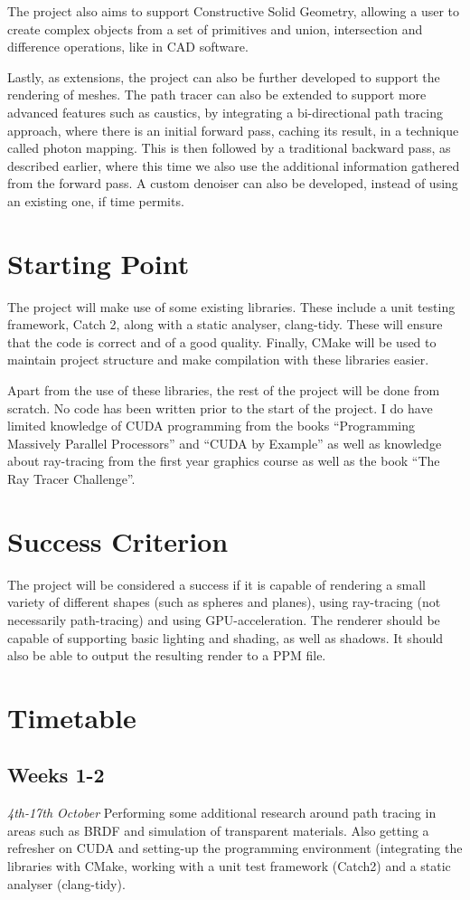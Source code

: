 \documentclass[12pt, a4paper]{article}
\newcommand{\newtime}[3]{
    \subsection*{#1}
    \vspace{-\baselineskip}
    \emph{#2}
    \vspace{\baselineskip}
    \newline
    #3
}
\begin{document}
    The project also aims to support Constructive Solid Geometry, allowing a user to create complex objects from a set of primitives and union, intersection and difference operations, like in CAD software.

    Lastly, as extensions, the project can also be further developed to support the rendering of meshes. The path tracer can also be extended to support more advanced features such as caustics, by integrating a bi-directional path tracing approach, where there is an initial forward pass, caching its result, in a technique called photon mapping. This is then followed by a traditional backward pass, as described earlier, where this time we also use the additional information gathered from the forward pass. A custom denoiser can also be developed, instead of using an existing one, if time permits.

    \section*{Starting Point}
    The project will make use of some existing libraries. These include a unit testing framework, Catch 2, along with a static analyser, clang-tidy. These will ensure that the code is correct and of a good quality. Finally, CMake will be used to maintain project structure and make compilation with these libraries easier.

    Apart from the use of these libraries, the rest of the project will be done from scratch. No code has been written prior to the start of the project. I do have limited knowledge of CUDA programming from the books “Programming Massively Parallel Processors” and “CUDA by Example” as well as knowledge about ray-tracing from the first year graphics course as well as the book “The Ray Tracer Challenge”.

    \section*{Success Criterion}
    The project will be considered a success if it is capable of rendering a small variety of different shapes (such as spheres and planes), using ray-tracing (not necessarily path-tracing) and using GPU-acceleration. The renderer should be capable of supporting basic lighting and shading, as well as shadows. It should also be able to output the resulting render to a PPM file.

    \section*{Timetable}
    \newtime{Weeks 1-2}{4th-17th October}{Performing some additional research around path tracing in areas such as BRDF and simulation of transparent materials. Also getting a refresher on CUDA and setting-up the programming environment (integrating the libraries with CMake, working with a unit test framework (Catch2) and a static analyser (clang-tidy).}
\end{document}

